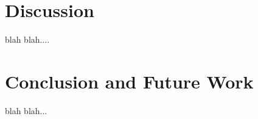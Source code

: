 \documentclass[conference]{IEEEtran}
\begin{document}


\section{Discussion}
blah blah....

\section{Conclusion and Future Work}
blah blah...



\end{document}
